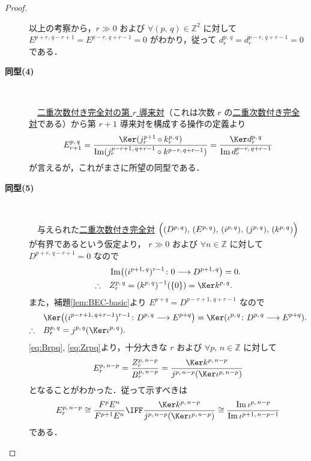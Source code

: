 \documentclass[algtopo_main]{subfiles}
\begin{document}
\begin{proof}
\begin{description}
        以上の考察から，$r \gg 0$ および $\forall (p,\, q) \in \mathbb{Z}^2$ に対して $E^{p+r,\, q-r+1} = E^{p-r,\, q+r-1} = 0$ がわかり，従って $d_r^{p,\, q} = d_r^{p-r,\, q+r-1} = 0$ である．

        \item[\textbf{同型(4)}] 　
        
        　\hyperref[def:DC-BEC]{二重次数付き完全対の第 $r$ 導来対}（これは次数 $r$ の\hyperref[def:BEC]{二重次数付き完全対}である）から第 $r+1$ 導来対を構成する操作の定義より
        \begin{align}
            E_{r+1}^{p,\, q} = \frac{\Ker (j_r^{p+1} \circ k_r^{p,\, q})}{\Im (j_r^{p-r+1,\, q+r-1} \circ k^{p-r,\, q+r-1})} = \frac{\Ker d_r^{p,\, q}}{\Im d_r^{p-r,\, q+r-1}}
        \end{align}
        が言えるが，これがまさに所望の同型である．

        \item[\textbf{同型(5)}] 　
        
        　与えられた\hyperref[def:BEC]{二重次数付き完全対} $\Bigl( (D^{p,\, q}),\, (E^{p,\, q}),\, (i^{p,\, q}),\, (j^{p,\, q}),\, (k^{p,\, q}) \Bigr)$ が有界であるという仮定より，
        $r \gg 0$ および $\forall n \in \mathbb{Z}$ に対して $D^{p+r,\, q-r+1} = 0$ なので
        \begin{align}
            &\Im \bigl( (i^{p+1,\, q})^{r-1} \colon 0 \lto D^{p+1,\, q} \bigr) = 0. \\ 
            \therefore \quad &Z_r^{p,\, q} = (k^{p,\, q})^{-1}(\{0\}) = \Ker k^{p,\, q}. \label{eq:Zrpq}
        \end{align}
        また，補題\ref{lem:BEC-basic}より $E^{p+q} = D^{p-r+1,\, q+r-1}$ なので
        \begin{align}
            &\Ker \bigl( (i^{p-r+1,\, q+r-1})^{r-1} \colon D^{p,\, q} \lto E^{p+q} \bigr) = \Ker (\iota^{p,\, q} \colon D^{p,\, q} \lto E^{p+q}). \\
            \therefore\quad &B_r^{p,\, q}  = j^{p,\, q} (  \Ker \iota^{p,\, q} ).  \label{eq:Brpq}
        \end{align}
        \eqref{eq:Brpq}, \eqref{eq:Zrpq}より，十分大きな $r$ および $\forall p,\, n \in \mathbb{Z}$ に対して
        \begin{align}
            E_r^{p,\, n-p} = \frac{Z_r^{p,\, n-p}}{B_r^{p,\, n-p}} = \frac{\Ker k^{p,\, n-p}}{j^{p,\, n-p}(\Ker \iota^{p,\, n-p})}
        \end{align}
        となることがわかった．従って示すべきは
        \begin{align}
            E_r^{p,\, n-p} \cong \frac{F^p E^n}{F^{p+1} E^n} \IFF \frac{\Ker k^{p,\, n-p}}{j^{p,\, n-p}(\Ker \iota^{p,\, n-p})} \cong \frac{\Im \iota^{p,\, n-p}}{\Im \iota^{p+1,\, n-p-1}}
        \end{align}
        である．
        

\end{description}
\end{proof}
\end{document}
